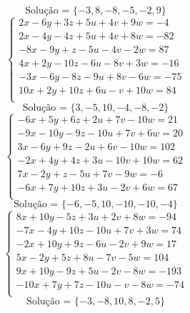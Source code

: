 \documentclass[12pt,oneside,a4paper]{article}
\begin{document}
\begin{equation*}
\text{Solução = }\{-3,8,-8,-5,-2,9\}
\end{equation*}
\vspace{\baselineskip}
\begin{equation*}
\begin{cases}
2x-6y+3z+5u+4v+9w=-4 \\
2x-4y-4z+5u+4v+8w=-82 \\
-8x-9y+z-5u-4v-2w=87 \\
4x+2y-10z-6u-8v+3w=-16 \\
-3x-6y-8z-9u+8v-6w=-75 \\
10x+2y+10z+6u-v+10w=84 \\
\end{cases}
\end{equation*}
\begin{equation*}
\text{Solução = }\{3,-5,10,-4,-8,-2\}
\end{equation*}
\vspace{\baselineskip}
\begin{equation*}
\begin{cases}
-6x+5y+6z+2u+7v-10w=21 \\
-9x-10y-9z-10u+7v+6w=20 \\
3x-6y+9z-2u+6v-10w=102 \\
-2x+4y+4z+3u-10v+10w=62 \\
7x-2y+z-5u+7v-9w=-6 \\
-6x+7y+10z+3u-2v+6w=67 \\
\end{cases}
\end{equation*}
\begin{equation*}
\text{Solução = }\{-6,-5,10,-10,-10,-4\}
\end{equation*}
\vspace{\baselineskip}
\begin{equation*}
\begin{cases}
8x+10y-5z+3u+2v+8w=-94 \\
-7x-4y+10z-10u+7v+3w=74 \\
-2x+10y+9z-6u-2v+9w=17 \\
5x-2y+5z+8u-7v-5w=104 \\
9x+10y-9z+5u-2v-8w=-193 \\
-10x+7y+7z-10u-v-8w=-74 \\
\end{cases}
\end{equation*}
\begin{equation*}
\text{Solução = }\{-3,-8,10,8,-2,5\}
\end{equation*}
\end{document}
